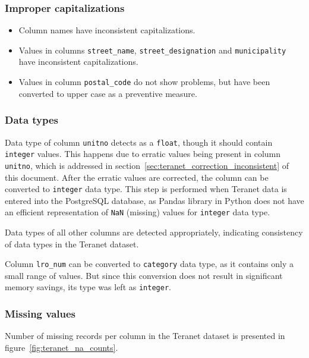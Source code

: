 \documentclass[11pt]{article}
\begin{document}
    \subsubsection{Improper capitalizations} \label{subsubsec:teranet_capitalizations}

    \begin{itemize}
        \item Column names have inconsistent capitalizations.
        \item Values in columns \texttt{street\_name}, \texttt{street\_designation} and \texttt{municipality} have inconsistent capitalizations.
        \item Values in column \texttt{postal\_code} do not show problems, but have been converted to upper case as a preventive measure.
    \end{itemize}

    \subsubsection{Data types} \label{subsubsec:teranet_data_types}

    Data type of column \texttt{unitno} detects as a \texttt{float}, though it should contain \texttt{integer} values.
    This happens due to erratic values being present in column \texttt{unitno}, which is addressed in section~\ref{sec:teranet_correction_inconsistent} of this document.
    After the erratic values are corrected, the column can be converted to \texttt{integer} data type.
    This step is performed when Teranet data is entered into the PostgreSQL database, as Pandas library in Python does not have an efficient representation of \texttt{NaN} (missing) values for \texttt{integer} data type\cite{PandasDevelopmentCommunity2019}.

    Data types of all other columns are detected appropriately, indicating consistency of data types in the Teranet dataset.

    Column \texttt{lro\_num} can be converted to \texttt{category} data type, as it contains only a small range of values.
    But since this conversion does not result in significant memory savings, its type was left as \texttt{integer}.

    \subsubsection{Missing values} \label{subsubsec:teranet_missing_values}

    Number of missing records per column in the Teranet dataset is presented in figure~\ref{fig:teranet_na_counts}.
\end{document}
